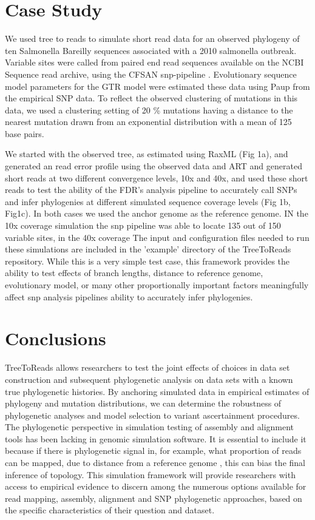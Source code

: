 \documentclass{bioinfo}
\begin{document}
\section{Case Study}
We used tree to reads to simulate short read data for an observed phylogeny of ten Salmonella Bareilly sequences associated with a 2010 salmonella outbreak.
Variable sites were called from paired end read sequences available on the NCBI Sequence read archive, using the CFSAN snp-pipeline \citep{pettengill_evaluation_2014}.
Evolutionary sequence model parameters for the GTR model were estimated these data using Paup \citep{swofford_paup:_2001} from the empirical SNP data. 
To reflect the observed clustering of mutations in this data, we used a clustering setting of 20 \% mutations having a distance to the nearest mutation drawn 
from an exponential distribution with a mean of 125 base pairs.

We started with the observed tree, as estimated using RaxML \citep{stamatakis_novel_2013} (Fig 1a), and generated an read error profile using the observed data and ART \citep{huang_art:_2012}
and generated short reads at two different convergence levels, 10x and 40x, 
and used these short reads to test the ability of the FDR's analysis pipeline to accurately call SNPs and infer phylogenies at different simulated sequence coverage levels (Fig 1b, Fig1c).
In both cases we used the anchor genome as the reference genome.
IN the 10x coverage simulation the snp pipeline was able to locate 135 out of 150 variable sites, in the 40x coverage 
The input and configuration files needed to run these simulations are included in the 'example' directory of the TreeToReads repository.
While this is a very simple test case, this framework provides the ability to test effects of branch lengths, distance to reference genome, evolutionary model, or many other proportionally important factors 
meaningfully affect snp analysis pipelines ability to accurately infer phylogenies.

\section{Conclusions}
TreeToReads allows researchers to test the joint effects of choices in data set construction and subsequent phylogenetic analysis on data sets with a known true phylogenetic histories.
By anchoring simulated data in empirical estimates of phylogeny and mutation distributions, 
we can determine the robustness of phylogenetic analyses and model selection to variant ascertainment procedures.
The phylogenetic perspective in simulation testing of assembly and alignment tools has been lacking in genomic simulation software.
It is essential to include it because if there is phylogenetic signal in, for example, what proportion of reads can be mapped, due to distance from a reference genome \citep{bertels_automated_2014},
this can bias the final inference of topology.
This simulation framework will provide researchers with access to empirical evidence to discern among the numerous options available for read mapping, assembly, alignment and SNP phylogenetic approaches,
based on the specific characteristics of their question and dataset.
\end{document}
